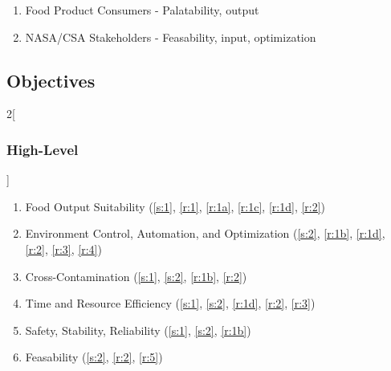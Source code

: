 \documentclass{../tex/report}
\begin{document}
\begin{enumerate}[label=S\arabic*., ref=S\arabic*]
    \item \label{s:1} Food Product Consumers - Palatability, output
    \item \label{s:2} NASA/CSA Stakeholders - Feasability, input, optimization
\end{enumerate}

\subsection{Objectives}
\label{sec:objectives}

\begin{multicols}{2}[\subsubsection{High-Level}\label{sec:hlos}]
    \begin{enumerate}[label=HL\arabic*., ref=HL\arabic*]
        \item \label{hl:output} Food Output Suitability \hfill (\ref{s:1}, \ref{r:1}, \ref{r:1a}, \ref{r:1c}, \ref{r:1d}, \ref{r:2})
        \item \label{hl:environment} Environment Control, Automation, and Optimization \hfill (\ref{s:2}, \ref{r:1b}, \ref{r:1d}, \ref{r:2}, \ref{r:3}, \ref{r:4})
        \item \label{hl:contamination} Cross-Contamination \hfill (\ref{s:1}, \ref{s:2}, \ref{r:1b}, \ref{r:2})
        \item \label{hl:efficiency} Time and Resource Efficiency \hfill (\ref{s:1}, \ref{s:2}, \ref{r:1d}, \ref{r:2}, \ref{r:3})
        \item \label{hl:safety} Safety, Stability, Reliability \hfill (\ref{s:1}, \ref{s:2}, \ref{r:1b})
        \item \label{hl:feasability} Feasability \hfill (\ref{s:2}, \ref{r:2}, \ref{r:5})
    \end{enumerate}
\end{multicols}
\end{document}
